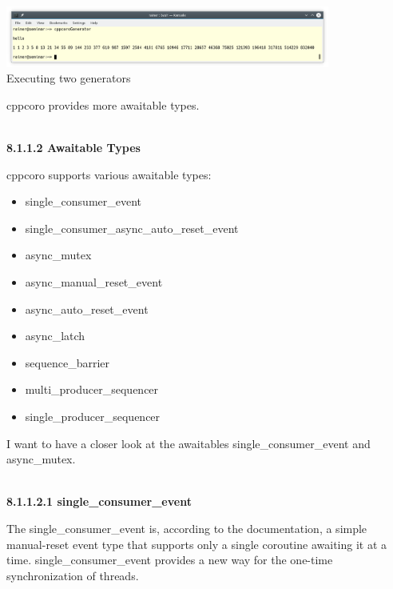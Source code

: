 \begin{center}
\includegraphics[width=0.8\textwidth]{content/5/chapter8/images/2.png}\\
Executing two generators
\end{center}

cppcoro provides more awaitable types.

\hspace*{\fill} \\ %
\noindent
\textbf{8.1.1.2\hspace{0.2cm} Awaitable Types}

cppcoro supports various awaitable types:

\begin{itemize}
\item 
single\_consumer\_event

\item 
single\_consumer\_async\_auto\_reset\_event

\item 
async\_mutex

\item 
async\_manual\_reset\_event

\item 
async\_auto\_reset\_event

\item 
async\_latch

\item 
sequence\_barrier

\item 
multi\_producer\_sequencer

\item 
single\_producer\_sequencer
\end{itemize}

I want to have a closer look at the awaitables single\_consumer\_event and async\_mutex.

\hspace*{\fill} \\ %
\noindent
\textbf{8.1.1.2.1\hspace{0.2cm} single\_consumer\_event}

The single\_consumer\_event is, according to the documentation, a simple manual-reset event type that supports only a single coroutine awaiting it at a time. single\_consumer\_event provides a new way for the one-time synchronization of threads.

